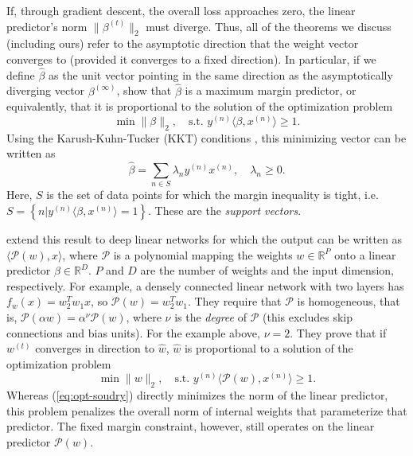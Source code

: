 \documentclass{article}
\theoremstyle{plain}
\theoremstyle{definition}
\theoremstyle{remark}
\begin{document}
If, through gradient descent, the overall loss approaches zero, the linear predictor's norm $\|\beta^{(t)}\|_2$ must diverge. Thus, all of the theorems we discuss (including ours) refer to the asymptotic direction that the weight vector converges to (provided it converges to a fixed direction).  In particular, if we define $\hat{\beta}$ as the unit vector pointing in the same direction as the asymptotically diverging vector $\beta^{(\infty)}$, \citet{soudry_implicit_2018} show that $\hat{\beta}$ is a maximum margin predictor, or equivalently, that it is proportional to the solution of the optimization problem
\begin{equation}
\label{eq:opt-soudry}
    \min\|\beta\|_2,\quad\text{s.t. }y^{(n)}\langle\beta,x^{(n)}\rangle\geq1.
\end{equation}
Using the Karush-Kuhn-Tucker (KKT) conditions \citep{karush_minima_1939, kuhn_nonlinear_1951}, this minimizing vector can be written as
\begin{equation}
\label{eq:stat-soudry}
   \hat{\beta}=\sum_{n\in S}\lambda_ny^{(n)}x^{(n)},\quad
    \lambda_n\geq 0.
\end{equation}
Here, $S$ is the set of data points for which the margin inequality is tight, i.e. $S=\left\{n|y^{(n)}\langle\beta,x^{(n)}\rangle=1\right\}$. These are the \emph{support vectors}.

\citet{gunasekar_implicit_2018} extend this result to deep linear networks for which the output can be written as $\langle\mathcal{P}(w),x\rangle$, where $\mathcal{P}$ is a polynomial mapping the weights $w\in\mathbb{R}^P$ onto a linear predictor $\beta\in\mathbb{R}^D$.
$P$ and $D$ are the number of weights and the input dimension, respectively.
For example, a densely connected linear network with two layers has $f_w(x)=w_2^Tw_1x$, so $\mathcal{P}(w)=w_2^Tw_1$.
They require that $\mathcal{P}$ is homogeneous, that is, $\mathcal{P}(\alpha w)=\alpha^{\nu}\mathcal{P}(w)$, where $\nu$ is the \emph{degree} of $\mathcal{P}$ (this excludes skip connections and bias units). For the example above, $\nu=2$.
They prove that if $w^{(t)}$ converges in direction to $\hat{w}$, $\hat{w}$ is proportional to a solution of the optimization problem
\begin{equation}
\label{eq:opt-gunasekar}
    \min\|w\|_2,\quad\text{s.t. }y^{(n)}\langle\mathcal{P}(w),x^{(n)}\rangle\geq1.
\end{equation}
Whereas (\ref{eq:opt-soudry}) directly minimizes the norm of the linear predictor, this problem penalizes the overall norm of internal weights that parameterize that predictor.
The fixed margin constraint, however, still operates on the linear predictor $\mathcal{P}(w)$.
\end{document}
